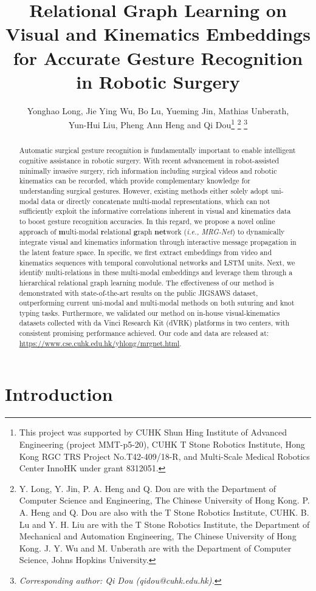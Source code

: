 \documentclass[letterpaper, 10 pt, conference]{ieeeconf}
\title{\LARGE \bf
Relational Graph Learning on Visual and Kinematics Embeddings for Accurate Gesture Recognition in Robotic Surgery
}
\author{
Yonghao Long, Jie Ying Wu, Bo Lu, Yueming Jin, Mathias Unberath, \\ Yun-Hui Liu, Pheng Ann Heng and Qi Dou\thanks{This project was supported by CUHK Shun Hing Institute of Advanced Engineering (project MMT-p5-20), CUHK T Stone Robotics Institute, Hong Kong RGC TRS Project No.T42-409/18-R, and Multi-Scale Medical Robotics Center InnoHK under grant 8312051.}
\thanks{Y. Long, Y. Jin, P. A. Heng and Q. Dou are with the Department of Computer Science and Engineering, The Chinese University of Hong Kong. P. A. Heng and Q. Dou are also with the T Stone Robotics Institute, CUHK. B. Lu and Y. H. Liu are with the T Stone Robotics Institute, the Department of Mechanical and Automation Engineering, The Chinese University of Hong Kong. J. Y. Wu and M. Unberath are with the Department of Computer Science, Johns Hopkins University.}
\thanks{\textit{Corresponding author: Qi Dou (qidou@cuhk.edu.hk).}}}
\begin{document}
\maketitle
\thispagestyle{empty}
\pagestyle{empty}
\begin{abstract}

Automatic surgical gesture recognition is fundamentally important to enable intelligent cognitive assistance in robotic surgery. With recent advancement in robot-assisted minimally invasive surgery, rich information including surgical videos and robotic kinematics can be recorded, which provide complementary knowledge for understanding surgical gestures. However, existing methods either solely adopt uni-modal data or directly concatenate multi-modal representations, which can not sufficiently exploit the informative correlations inherent in visual and kinematics data to boost gesture recognition accuracies. In this regard, we propose a novel online approach of \textbf{m}ulti-modal \textbf{r}elational \textbf{g}raph \textbf{net}work (\emph{i.e., MRG-Net}) to dynamically integrate visual and kinematics information through interactive message propagation in the latent feature space. In specific, we first extract embeddings from video and kinematics sequences with temporal convolutional networks and LSTM units. Next, we identify multi-relations in these multi-modal embeddings and leverage them through a hierarchical relational graph learning module. The effectiveness of our method is demonstrated with state-of-the-art results on the public JIGSAWS dataset, outperforming current uni-modal and multi-modal methods on both suturing and knot typing tasks. Furthermore, we validated our method on in-house visual-kinematics datasets collected with da Vinci Research Kit (dVRK) platforms in two centers, with consistent promising performance achieved. Our code and data are released at: \href{https://www.cse.cuhk.edu.hk/\%7eyhlong/mrgnet.html}{https://www.cse.cuhk.edu.hk/\texttildelow yhlong/mrgnet.html}.


\end{abstract}


\section{Introduction}
\end{document}

